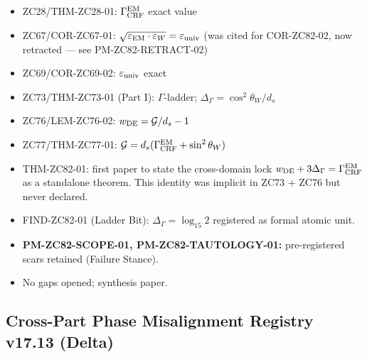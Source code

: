 \documentclass[12pt, a4paper]{article}
\begin{document}
\begin{inheritbox}[title={ZC82 --- Backward Inheritance from Parts A--I}]
\begin{itemize}[noitemsep, leftmargin=1.5em]
  \item ZC28/THM-ZC28-01: $\Gamma_{\rm CRF}^{\rm EM}$ exact value
  \item ZC67/COR-ZC67-01: $\sqrt{\varepsilon_{\rm EM}\cdot\varepsilon_W}
    = \varepsilon_{\rm univ}$ (was cited for COR-ZC82-02, now retracted
    --- see PM-ZC82-RETRACT-02)
  \item ZC69/COR-ZC69-02: $\varepsilon_{\rm univ}$ exact
  \item ZC73/THM-ZC73-01 (Part I): $\Gamma$-ladder; $\Delta_\Gamma = \cos^2\theta_W/d_s$
  \item ZC76/LEM-ZC76-02: $w_{\rm DE} = \mathcal{G}/d_s - 1$
  \item ZC77/THM-ZC77-01: $\mathcal{G} = d_s(\Gamma_{\rm CRF}^{\rm EM} + \sin^2\theta_W)$
\end{itemize}
\end{inheritbox}

\begin{correctionbox}[title={ZC82 --- Forward Corrections / Cross-Domain Lock}]
\begin{itemize}[noitemsep, leftmargin=1.5em]
  \item THM-ZC82-01: first paper to state the cross-domain lock
    $w_{\rm DE} + 3\Delta_\Gamma = \Gamma_{\rm CRF}^{\rm EM}$ as a standalone
    theorem. This identity was implicit in ZC73 + ZC76 but never
    declared.
  \item FIND-ZC82-01 (Ladder Bit): $\Delta_\Gamma = \log_{15}2$
    registered as formal atomic unit.
  \item \textbf{PM-ZC82-SCOPE-01, PM-ZC82-TAUTOLOGY-01:}
    pre-registered scars retained (Failure Stance).
  \item No gaps opened; synthesis paper.
\end{itemize}
\end{correctionbox}

\subsection{Cross-Part Phase Misalignment Registry v17.13 (Delta)}
\end{document}
